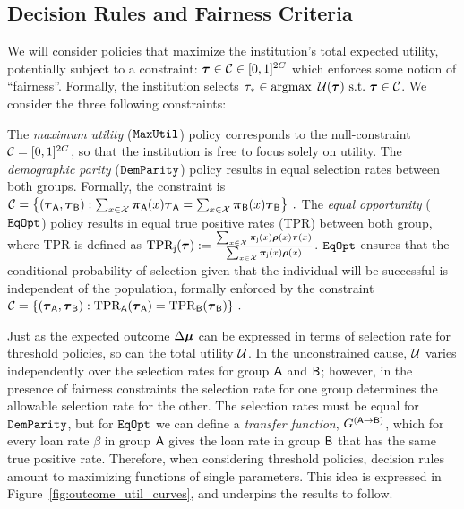 \subsection{Decision Rules and Fairness Criteria}
\label{sec:fairness_criteria}
We will consider policies that maximize the institution's total expected utility, potentially subject to a constraint: $\boldsymbol{\tau} \in \mathcal{C} \in [0,1]^{2C}$ which enforces some notion of ``fairness''. Formally, the institution selects $\tau_* \in \argmax~\Util(\pol) ~\subto~ \pol \in \Constraint$. We consider the three following constraints:
\begin{defn} The \emph{maximum utility} ($\mathtt{MaxUtil}$) policy corresponds to the null-constraint $\mathcal{C} = [0,1]^{2C}$, so that the institution is free to focus solely on utility. The \emph{demographic parity} ($\mathtt{DemParity}$) policy results in equal selection rates between both groups. Formally, the constraint is
$\mathcal{C} = \left\{(\boldsymbol{\tau}_{\mathsf{A}},\boldsymbol{\tau}_{\mathsf{B}}): \sum_{x \in \mathcal{X}} \boldsymbol{\pi}_{\mathsf{A}}(x)\boldsymbol{\tau}_{\mathsf{A}} =
\sum_{x \in \mathcal{X}} \boldsymbol{\pi}_{\mathsf{B}}(x)\boldsymbol{\tau}_{\mathsf{B}}\right\}\:.$
The \emph{equal opportunity} ($\mathtt{EqOpt}$) policy results in equal true positive rates (TPR) between both group, where TPR is defined as $\mathrm{TPR}_{\mathsf{j}}(\boldsymbol{\tau}) :=\frac{\sum_{x \in \mathcal{X}} \boldsymbol{\pi}_{\mathsf{j}}(x)\boldsymbol{\rho}(x)\boldsymbol{\tau}(x)}{\sum_{x \in \mathcal{X}} \boldsymbol{\pi}_{\mathsf{j}}(x)\boldsymbol{\rho}(x)}$.  $\mathtt{EqOpt}$ ensures that the conditional probability of selection given that the individual will be successful is independent of the population, formally enforced by the constraint
$\mathcal{C} = \left\{(\boldsymbol{\tau}_{\mathsf{A}},\boldsymbol{\tau}_{\mathsf{B}}): \mathrm{TPR}_{\mathsf{A}}(\boldsymbol{\tau}_{\mathsf{A}}) = \mathrm{TPR}_{\mathsf{B}}(\boldsymbol{\tau}_{\mathsf{B}}) \right\}\,.$
\end{defn}

Just as the expected outcome $\Delta\boldsymbol{\mu}$ can be expressed in terms of selection rate for threshold policies, so can the total utility $\mathcal{U}$. In the unconstrained cause, $\mathcal{U}$ varies independently over the selection rates for group $\mathsf{A}$ and $\mathsf{B}$; however, in the presence of fairness constraints the selection rate for one group determines the allowable selection rate for the other. The selection rates must be equal for $\mathtt{DemParity}$, but for $\mathtt{EqOpt}$ we can define a \emph{transfer function}, $G^{(\mathsf{A}\to\mathsf{B})}$, which for every loan rate $\beta$ in group $\mathsf{A}$ gives the loan rate in group $\mathsf{B}$ that has the same true positive rate. Therefore, when considering threshold policies, decision rules amount to maximizing functions of single parameters. This idea is expressed in Figure~\ref{fig:outcome_util_curves}, and underpins the results to follow.


